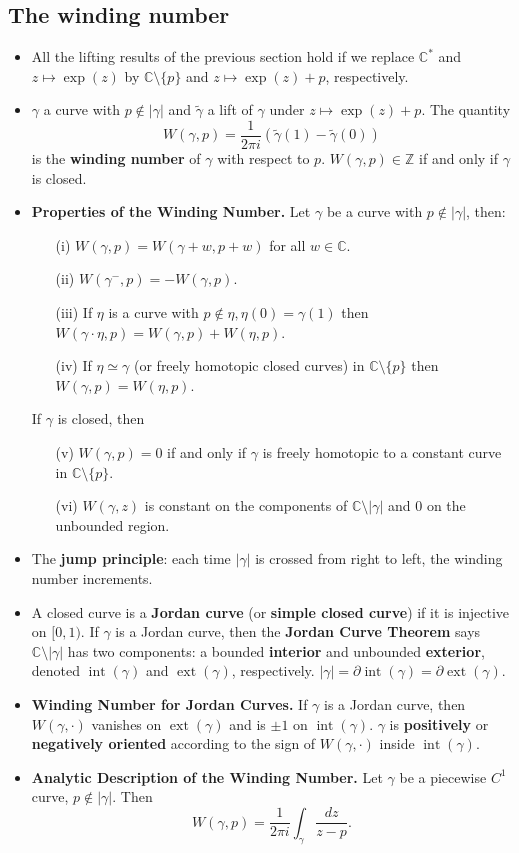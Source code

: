 \documentclass{article}
\DeclareMathOperator{\interior}{int}
\DeclareMathOperator{\exterior}{ext}
\newenvironment{topic}[1]{%
{\subsection{#1}}%
\begin{itemize}%
}{%
\end{itemize}%
}
\newcommand{\theorem}[1]{\item {\bf #1.}}
\newcommand{\term}[1]{{\bf #1}}
\newcommand{\remark}{\item}
\begin{document}
\begin{topic}{The winding number}

\remark All the lifting results of the previous section hold if we replace $\mathbb{C}^\ast$ and $z \mapsto \exp(z)$ by $\mathbb{C} \setminus \{p\}$ and $z \mapsto \exp(z) + p$, respectively.

\remark $\gamma$ a curve with $p \not\in |\gamma|$ and $\tilde{\gamma}$ a lift of $\gamma$ under $z \mapsto \exp(z) + p$. The quantity $$W(\gamma, p) = \dfrac{1}{2 \pi i}\left(\tilde{\gamma}(1) - \tilde{\gamma}(0)\right)$$ is the \term{winding number} of $\gamma$ with respect to $p$. $W(\gamma, p) \in \mathbb{Z}$ if and only if $\gamma$ is closed.

\theorem{Properties of the Winding Number} Let $\gamma$ be a curve with $p \not\in |\gamma|$, then:
\begin{enumerate}
\item[(i)] $W(\gamma, p) = W(\gamma + w, p + w)$ for all $w \in \mathbb{C}$.
\item[(ii)] $W(\gamma^-, p) = -W(\gamma, p)$.
\item[(iii)] If $\eta$ is a curve with $p \not\in \eta, \eta(0) = \gamma(1)$ then $W(\gamma \cdot \eta, p) = W(\gamma, p) + W(\eta, p)$.
\item[(iv)] If $\eta \simeq \gamma$ (or freely homotopic closed curves) in $\mathbb{C} \setminus \{ p \}$ then $W(\gamma, p) = W(\eta, p)$.
\end{enumerate}
If $\gamma$ is closed, then
\begin{enumerate}
\item[(v)] $W(\gamma, p) = 0$ if and only if $\gamma$ is freely homotopic to a constant curve in $\mathbb{C} \setminus \{ p \}$.
\item[(vi)] $W(\gamma, z)$ is constant on the components of $\mathbb{C} \setminus |\gamma|$ and $0$ on the unbounded region.
\end{enumerate}

\remark The \term{jump principle}: each time $|\gamma|$ is crossed from right to left, the winding number increments.

\remark A closed curve is a \term{Jordan curve} (or \term{simple closed curve}) if it is injective on $[0, 1)$. If $\gamma$ is a Jordan curve, then the \term{Jordan Curve Theorem} says $\mathbb{C} \setminus |\gamma|$ has two components: a bounded \term{interior} and unbounded \term{exterior}, denoted $\interior(\gamma)$ and $\exterior(\gamma)$, respectively. $|\gamma| = \partial \interior(\gamma) = \partial \exterior(\gamma)$.

\theorem{Winding Number for Jordan Curves} If $\gamma$ is a Jordan curve, then $W(\gamma, \cdot)$ vanishes on $\exterior(\gamma)$ and is $\pm 1$ on $\interior(\gamma)$. $\gamma$ is \term{positively} or \term{negatively oriented} according to the sign of $W(\gamma, \cdot)$ inside $\interior(\gamma)$.

\theorem{Analytic Description of the Winding Number} Let $\gamma$ be a piecewise $C^1$ curve, $p \not\in |\gamma|$. Then $$W(\gamma, p) = \dfrac{1}{2 \pi i} \int_{\gamma} \dfrac{dz}{z - p}.$$

\end{topic}
\end{document}
